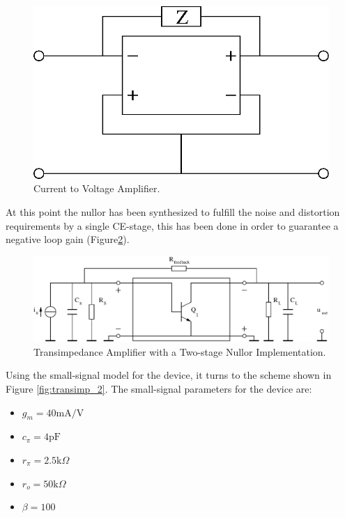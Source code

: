 \documentclass[conference]{IEEEtran}
\begin{document}
\begin{figure}[hbtp]
	\centering
	\includegraphics[scale=.5]{figures/curr_volt_amp.eps}
	\caption{Current to Voltage Amplifier.}
	\label{fig:transimp}
\end{figure}

At this point the nullor has been synthesized to fulfill the noise and distortion requirements by a single CE-stage, this has been done in order to guarantee a negative loop gain (Figure\ref{fig:transimp_1}).

\begin{figure}[hbtp]
	\centering
	\includegraphics[scale=.45]{figures/transimp_1.eps}
	\caption{Transimpedance Amplifier with a Two-stage Nullor Implementation.}
	\label{fig:transimp_1}
\end{figure}

Using the small-signal model for the device, it turns to the scheme shown in Figure  \ref{fig:transimp_2}. The small-signal parameters for the device are:

\begin{itemize}
\item $g_m=40\text{mA/V}$
\item $c_{\pi}=4\text{pF}$
\item $r_{\pi}=2.5\text{k}\Omega$
\item $r_o=50\text{k}\Omega$
\item $\beta=100$
\end{itemize}
\end{document}
